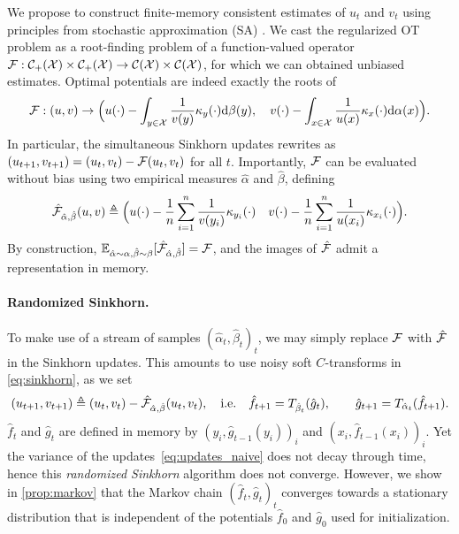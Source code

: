 We propose to construct finite-memory consistent estimates of $u_t$ and $v_t$ using
principles from stochastic approximation (SA) \cite{robbins1951stochastic}. We cast
the regularized OT problem as a root-finding problem of a function-valued operator $\Ff: \Cc_{+}(\Xx) \times \Cc_{+}(\Xx) \to \Cc(\Xx) \times \Cc(\Xx)$,
for which we can obtained unbiased estimates. Optimal potentials are indeed
exactly the roots of
% 
\begin{equation}
    \Ff: (u, v) \to 
    \Big(u(\cdot) - \int_{y \in \Xx}
     \frac{1}{v(y)} \kappa_y(\cdot)  \d \beta(y),\quad
    v(\cdot) - \int_{x \in \Xx}
    \frac{1}{u(x)}  \kappa_x(\cdot)  \d \alpha(x)\Big).
\end{equation}
% 
In particular, the simultaneous Sinkhorn updates rewrites as $(u_{t+1}, v_{t+1}) = (u_{t},
v_{t}) - \Ff(u_t, v_t)$ for all $t$. Importantly, $\Ff$ can be
evaluated without bias using two empirical measures $\hat \alpha$ and
$\hat \beta$, defining
% 
\begin{equation}
    \hat \Ff_{\hat \alpha, \hat \beta}(u, v) \triangleq 
    \Big(u(\cdot) - \frac{1}{n} \sum_{i=1}^n
    \frac{1}{v(y_i)} \kappa_{y_i}(\cdot)\quad
    v(\cdot) - \frac{1}{n} \sum_{i=1}^n
   \frac{1}{u(x_i)}  \kappa_{x_i}(\cdot) \Big).
\end{equation}
By construction, $\EE_{\hat \alpha \sim \alpha, \hat \beta \sim \beta} [\hat \Ff_{\hat
\alpha, \hat \beta}] = \Ff$, and the images of $\hat \Ff$ admit a representation in memory.




\paragraph{Randomized Sinkhorn.}To make use of a stream of samples $(\hat \alpha_t, \hat
 \beta_t)_t$, we may simply replace $\Ff$ with $\hat \Ff$ in the Sinkhorn updates.
 This amounts to use noisy soft $C$-transforms in \eqref{eq:sinkhorn}, as we set
\begin{equation}\label{eq:updates_naive}
    (u_{t+1}, v_{t+1}) \triangleq (u_{t},
    v_{t}) - \hat \Ff_{\hat \alpha, \hat \beta}(u_t, v_t),\quad\text{i.e.}\quad
     \hat f_{t+1} = \Ctrans{\hat g_t}{\hat \beta_t},
    \qquad \hat g_{t+1} = \Ctrans{\hat f_{t+1}}{\hat \alpha_t}.
\end{equation}
%
$\hat f_t$ and $\hat g_t$ are defined in memory by $(y_i, \hat g_{t-1}(y_i))_i$ and $(x_i,
\hat f_{t-1}(x_i))_i$. Yet the variance of the updates~\eqref{eq:updates_naive} does not
decay through time, hence this \textit{randomized Sinkhorn} algorithm does not
converge. However, we show in
\autoref{prop:markov} that the Markov chain ${(\hat f_t, \hat g_t)}_t$ converges
towards a stationary distribution that is independent of the potentials $\hat f_0$ and $\hat g_0$ used for
initialization.

